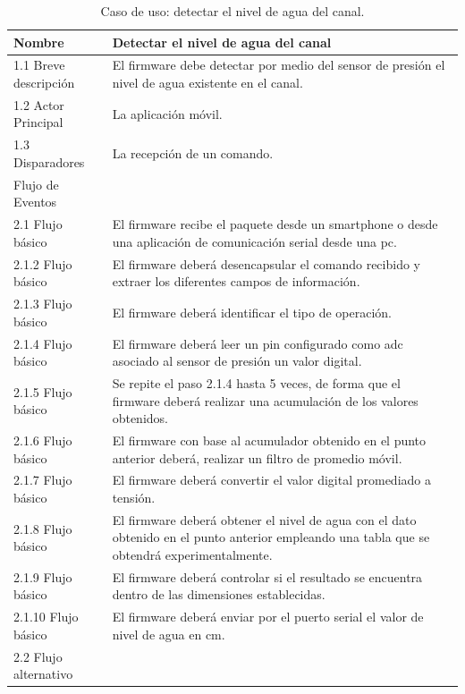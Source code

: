 \begin{table}[htpb]
\begin{center}
\caption{ Caso de uso: detectar el nivel de agua del canal.}
\begin{tabular}{ | m{4cm} | m{9.5cm} | }
\hline Nombre & Detectar el nivel de agua del canal \\ \hline
1.1 Breve descripción & 
El firmware debe detectar por medio del sensor de presión el nivel de agua existente en el canal. \\ \hline

 1.2 Actor Principal&La aplicación móvil.\\ \hline


 1.3 Disparadores & La recepción de un comando. \\ \hline

Flujo de Eventos& \\ \hline

 2.1 Flujo básico &
El firmware recibe el paquete desde un smartphone  o desde una aplicación de comunicación serial desde una pc. \\ \hline


 2.1.2 Flujo básico &
El firmware deberá desencapsular el comando recibido y extraer los diferentes campos de información. \\ \hline

 2.1.3 Flujo básico &
El firmware deberá identificar el tipo de operación. \\ \hline


 2.1.4 Flujo básico &
El firmware deberá leer un pin configurado como adc asociado al sensor de presión un valor digital. \\ \hline
 

2.1.5 Flujo básico &
Se repite el paso 2.1.4 hasta 5 veces, de forma que el firmware deberá realizar una acumulación de los valores obtenidos. \\ \hline


2.1.6 Flujo básico &
 El firmware con base al acumulador obtenido en el punto anterior deberá, realizar un filtro de promedio móvil.  \\ \hline
 
2.1.7 Flujo básico &
El firmware deberá convertir el valor digital promediado a tensión. \\ \hline 
2.1.8 Flujo básico &
El firmware deberá obtener el nivel de agua con el dato obtenido en el punto anterior empleando una tabla que se obtendrá experimentalmente. \\ \hline
2.1.9 Flujo básico &
El firmware deberá controlar si el resultado se encuentra dentro de las dimensiones establecidas. \\ \hline
2.1.10 Flujo básico &
El firmware deberá enviar por el puerto serial el valor de nivel de agua en cm. \\ \hline
2.2 Flujo alternativo &  \\ \hline



\end{tabular}
\end{center}
\end{table}
